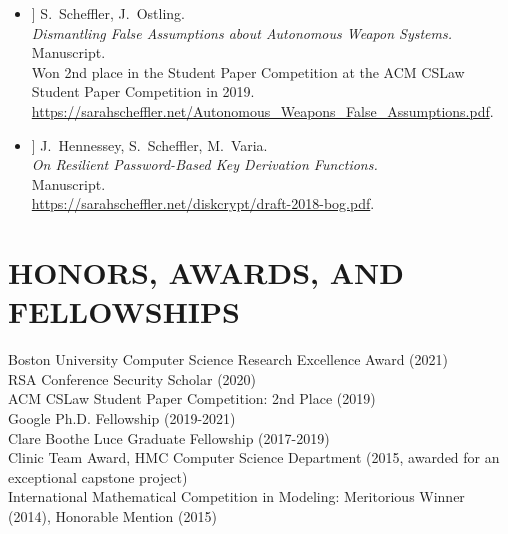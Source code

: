 \documentclass{res}
\begin{document}
\begin{resume}
\newcommand{\autonomousWeapons}{[15]\xspace}
\newcommand{\bog}{[16]\xspace}

\begin{itemize}
\item[\autonomousWeapons] S.~Scheffler, J.~Ostling. \\
\emph{Dismantling False Assumptions about Autonomous Weapon Systems.} \\
Manuscript.  \\
Won 2nd place in the Student Paper Competition at the ACM CSLaw Student Paper Competition in 2019. \\
\url{https://sarahscheffler.net/Autonomous_Weapons_False_Assumptions.pdf}.

\item[\bog] J.~Hennessey, S.~Scheffler, M.~Varia. \\
\emph{On Resilient Password-Based Key Derivation Functions.} \\
Manuscript.  \\
\url{https://sarahscheffler.net/diskcrypt/draft-2018-bog.pdf}.
\end{itemize}

\vspace{0.25in}

\section{HONORS, AWARDS, AND FELLOWSHIPS}
\vspace{0.1in}
    Boston University Computer Science Research Excellence Award (2021) \\
    RSA Conference Security Scholar (2020) \\
    ACM CSLaw Student Paper Competition: 2nd Place (2019) \\
    Google Ph.D. Fellowship (2019-2021) \\
    Clare Boothe Luce Graduate Fellowship (2017-2019) \\
    Clinic Team Award, HMC Computer Science Department (2015, awarded for an exceptional capstone project) \\
    International Mathematical Competition in Modeling: Meritorious Winner (2014), Honorable Mention (2015) \\       


\end{resume}
\end{document}
